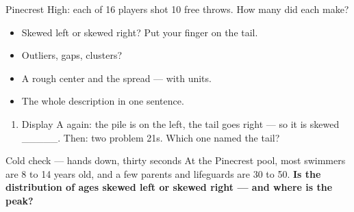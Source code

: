 \documentclass[aspectratio=169, 11pt]{beamer}
\begin{document}
\begin{frame}[t, plain]
  Pinecrest High: each of 16 players shot 10 free throws. How many did each make?
  \begin{center}
  \end{center}
  \begin{itemize}\setlength{\itemsep}{3pt}
    \item[21.] Skewed left or skewed right? Put your finger on the tail.
    \item[22.] Outliers, gaps, clusters?
    \item[23.] A rough center and the spread --- with units.
    \item[24.] The whole description in one sentence.
  \end{itemize}
\end{frame}

\begin{frame}[t, plain]
  \vspace{4pt}
  \begin{enumerate}\setlength{\itemsep}{5pt}
    \item Display A again: the pile is on the left, the tail goes right --- so it is skewed
          \_\_\_\_\_. Then: two problem 21s. Which one named the tail?
  \end{enumerate}
  \vspace{8pt}
  \begin{block}{Cold check --- hands down, thirty seconds}
    At the Pinecrest pool, most swimmers are 8 to 14 years old, and a few parents and
    lifeguards are 30 to 50. \textbf{Is the distribution of ages skewed left or skewed right ---
    and where is the peak?}
  \end{block}
\end{frame}
\end{document}
